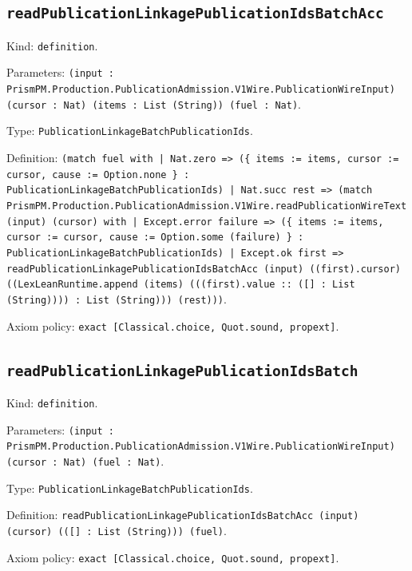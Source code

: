 \documentclass[11pt]{article}
\begin{document}
\subsection*{\texttt{readPublicationLinkagePublicationIdsBatchAcc}}
\noindent Kind: \texttt{definition}.\par
\noindent Parameters: \texttt{(input : PrismPM.Production.PublicationAdmission.V1Wire.PublicationWireInput) (cursor : Nat) (items : List (String)) (fuel : Nat)}.\par
\noindent Type: \texttt{PublicationLinkageBatchPublicationIds}.\par
\noindent Definition: \texttt{(match fuel with | Nat.zero => (\{ items := items, cursor := cursor, cause := Option.none \} : PublicationLinkageBatchPublicationIds) | Nat.succ rest => (match PrismPM.Production.PublicationAdmission.V1Wire.readPublicationWireText (input) (cursor) with | Except.error failure => (\{ items := items, cursor := cursor, cause := Option.some (failure) \} : PublicationLinkageBatchPublicationIds) | Except.ok first => readPublicationLinkagePublicationIdsBatchAcc (input) ((first).cursor) ((LexLeanRuntime.append (items) (((first).value :: ([] : List (String)))) : List (String))) (rest)))}.\par
\noindent Axiom policy: \texttt{exact [Classical.choice, Quot.sound, propext]}.\par
\subsection*{\texttt{readPublicationLinkagePublicationIdsBatch}}
\noindent Kind: \texttt{definition}.\par
\noindent Parameters: \texttt{(input : PrismPM.Production.PublicationAdmission.V1Wire.PublicationWireInput) (cursor : Nat) (fuel : Nat)}.\par
\noindent Type: \texttt{PublicationLinkageBatchPublicationIds}.\par
\noindent Definition: \texttt{readPublicationLinkagePublicationIdsBatchAcc (input) (cursor) (([] : List (String))) (fuel)}.\par
\noindent Axiom policy: \texttt{exact [Classical.choice, Quot.sound, propext]}.\par
\end{document}
